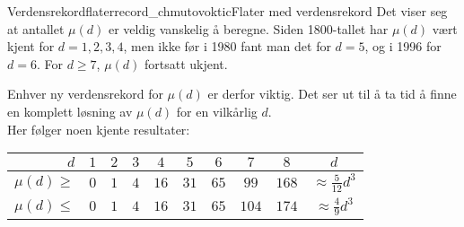 \begin{surferIntroPage}{Verdensrekordflater}{record_chmutovoktic}{Flater med verdensrekord}
  Det viser seg at antallet $\mu(d)$ er veldig vanskelig å beregne. Siden 1800-tallet har $\mu(d)$ 
  vært kjent for $d=1,2,3,4$, men ikke før i 1980 fant man det for $d=5$, og i 1996 for $d=6$.
  For $d\ge 7$, $\mu(d)$ fortsatt ukjent. 

  Enhver ny verdensrekord for $\mu(d)$ er derfor viktig. Det ser ut til å ta tid å finne en komplett løsning av $\mu(d)$ for en 
  vilkårlig $d$.\\ Her følger noen kjente resultater:
  
    
   \begin{center}
      \begin{tabular}{r|cccccccc|c}
        $d$ & $1$ & $2$ & $3$ & $4$ & $5$ & $6$ & $7$ & $8$ & $d$\\
        \hline
        \hline
        \rule{0pt}{1.2em}$\mu(d)\ge$ & $0$ & $1$ & $4$ & $16$ & $31$ & $65$ &
        $99$ & $168$ & 
        $\approx \frac{5}{12}d^3$\\[0.3em]
        \hline
        \rule{0pt}{1.2em}$\mu(d)\le$ & $0$ & $1$ & $4$ & $16$ & $31$ & $65$ &
        $104$ & $174$ & $\approx \frac{4}{9}d^3$
      \end{tabular}
    \end{center}
\end{surferIntroPage}
